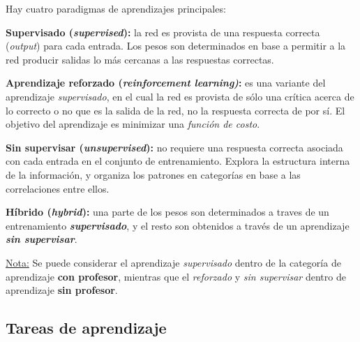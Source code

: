 \documentclass[10pt,a4paper]{article}
\begin{document}
Hay cuatro paradigmas de aprendizajes principales:
\begin{description}
\item \textbf{Supervisado (\textit{supervised}):} la red es provista de una respuesta correcta (\textit{output}) para cada entrada. Los pesos son determinados en base a permitir a la red producir salidas lo más cercanas a las respuestas correctas.
\item \textbf{Aprendizaje reforzado (\textit{reinforcement learning)}:} es una variante del aprendizaje \textit{supervisado}, en el cual la red es provista de sólo una crítica acerca de lo correcto o no que es la salida de la red, no la respuesta correcta de por sí. El objetivo del aprendizaje es minimizar una \textit{función de costo}.
\item \textbf{Sin supervisar (\textit{unsupervised}):} no requiere una respuesta correcta asociada con cada entrada en el conjunto de entrenamiento. Explora la estructura interna de la información, y organiza los patrones en categorías en base a las correlaciones entre ellos.
\item \textbf{Híbrido (\textit{hybrid}):} una parte de los pesos son determinados a traves de un entrenamiento \textbf{\textit{supervisado}}, y el resto son obtenidos a través de un aprendizaje \textbf{\textit{sin supervisar}}.
\end{description}

\underline{Nota:} Se puede considerar el aprendizaje \textit{supervisado} dentro de la categoría de aprendizaje \textbf{con profesor}, mientras que el \textit{reforzado} y \textit{sin supervisar} dentro de aprendizaje \textbf{sin profesor}.

\subsection{Tareas de aprendizaje}
\end{document}
